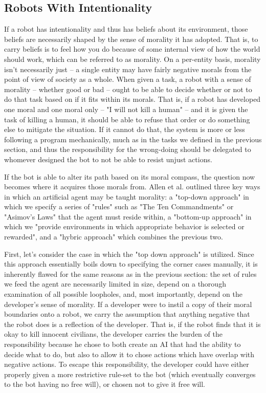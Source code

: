 \documentclass[12]{article}
\begin{document}
	\subsection{Robots With Intentionality}
		If a robot has intentionality and thus has beliefs about its environment, those beliefs are necessarily shaped by the sense of morality it has adopted. That is, to carry beliefs is to feel how you do because of some internal view of how the world should work, which can be referred to as morality. On a per-entity basis, morality isn't necessarily just -- a single entity may have fairly negative morals from the point of view of society as a whole. When given a task, a robot with a sense of morality -- whether good or bad -- ought to be able to decide whether or not to do that task based on if it fits within its morals. That is, if a robot has developed one moral and one moral only -- "I will not kill a human" -- and it is given the task of killing a human, it should be able to refuse that order or do something else to mitigate the situation. If it cannot do that, the system is more or less following a program mechanically, much as in the tasks we defined in the previous section, and thus the responsibility for the wrong-doing should be delegated to whomever designed the bot to not be able to resist unjust actions.
		
		If the bot is able to alter its path based on its moral compass, the question now becomes where it acquires those morals from. Allen et al. outlined three key ways in which an artificial agent may be taught morality: a "top-down approach" in which we specify a series of "rules" such as "The Ten Commandments" or "Asimov's Laws" that the agent must reside within, a "bottom-up approach" in which we "provide environments in which appropriate behavior is selected or rewarded", and a "hybric approach" which combines the previous two\cite{morality}. 
		
		First, let's consider the case in which the "top down approach"\cite{morality} is utilized. Since this approach essentially boils down to specifying the corner cases manually, it is inherently flawed for the same reasons as in the previous section: the set of rules we feed the agent are necessarily limited in size, depend on a thorough examination of all possible loopholes, and, most importantly, depend on the developer's sense of morality. If a developer were to instil a copy of their moral boundaries onto a robot, we carry the assumption that anything negative that the robot does is a reflection of the developer. That is, if the robot finds that it is okay to kill innocent civilians, the developer carries the burden of the responsibility because he chose to both create an AI that had the ability to decide what to do, but also to allow it to chose actions which have overlap with negative actions. To escape this responsibility, the developer could have either properly given a more restrictive rule-set to the bot (which eventually converges to the bot having no free will), or chosen not to give it free will.
		
\end{document}

